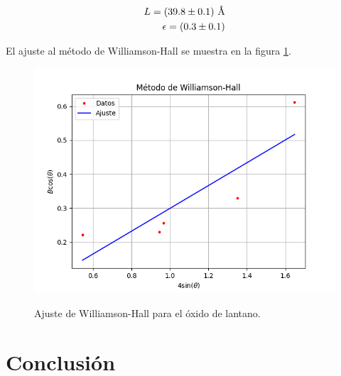 \documentclass[final,5p,times,twocolumn, nopreprintline]{elsarticle}
\numberwithin{equation}{section}
\begin{document}
\begin{align*}
L=(39.8\pm0.1)~\text{\r{A}}\\
\epsilon=(0.3\pm0.1)
\end{align*}

El ajuste al método de Williamson-Hall se muestra en la figura \ref{fig:wh}.

\begin{figure}[h!]
\centering
\includegraphics[width=0.8\columnwidth]{../wh.png} \label{fig:wh}
\caption{Ajuste de Williamson-Hall para el óxido de lantano.}
\end{figure}

\section{Conclusión}

 

%
%





\end{document}
